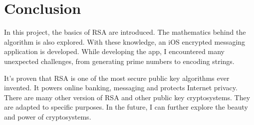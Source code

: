 \documentclass[]{article}
\begin{document}
\section{Conclusion}

In this project, the basics of RSA are introduced. The mathematics behind the algorithm is also explored. With these knowledge, an iOS encrypted messaging application is developed. While developing the app, I encountered many unexpected challenges, from generating prime numbers to encoding strings. 

It's proven that RSA is one of the most secure public key algorithms ever invented. It powers online banking, messaging and protects Internet privacy. There are many other version of RSA and other public key cryptosystems. They are adapted to specific purposes. In the future, I can further explore the beauty and power of cryptosystems. 
\end{document}

